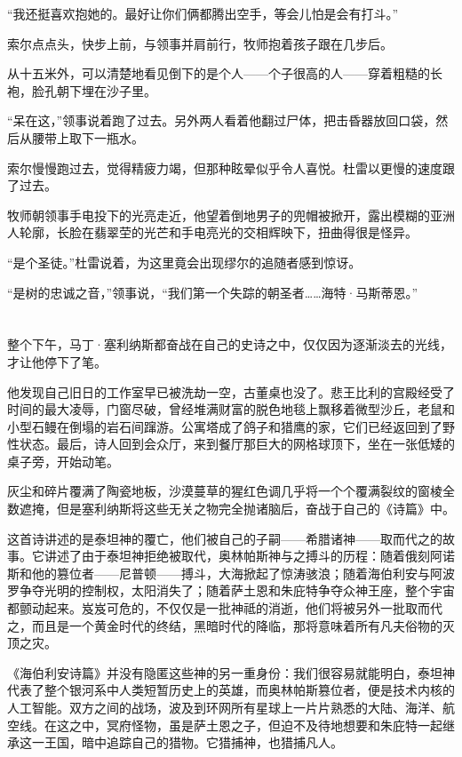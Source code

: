 \documentclass[AutoFakeBold=true]{book}
\begin{document}
``我还挺喜欢抱她的。最好让你们俩都腾出空手，等会儿怕是会有打斗。''

索尔点点头，快步上前，与领事并肩前行，牧师抱着孩子跟在几步后。

从十五米外，可以清楚地看见倒下的是个人——个子很高的人——穿着粗糙的长袍，脸孔朝下埋在沙子里。

``呆在这，''领事说着跑了过去。另外两人看着他翻过尸体，把击昏器放回口袋，然后从腰带上取下一瓶水。

索尔慢慢跑过去，觉得精疲力竭，但那种眩晕似乎令人喜悦。杜雷以更慢的速度跟了过去。

牧师朝领事手电投下的光亮走近，他望着倒地男子的兜帽被掀开，露出模糊的亚洲人轮廓，长脸在翡翠茔的光芒和手电亮光的交相辉映下，扭曲得很是怪异。

``是个圣徒。''杜雷说着，为这里竟会出现缪尔的追随者感到惊讶。

``是树的忠诚之音，''领事说，``我们第一个失踪的朝圣者……海特·马斯蒂恩。''

\chapter{}

整个下午，马丁·塞利纳斯都奋战在自己的史诗之中，仅仅因为逐渐淡去的光线，才让他停下了笔。

他发现自己旧日的工作室早已被洗劫一空，古董桌也没了。悲王比利的宫殿经受了时间的最大凌辱，门窗尽破，曾经堆满财富的脱色地毯上飘移着微型沙丘，老鼠和小型石鳗在倒塌的岩石间蹿游。公寓塔成了鸽子和猎鹰的家，它们已经返回到了野性状态。最后，诗人回到会众厅，来到餐厅那巨大的网格球顶下，坐在一张低矮的桌子旁，开始动笔。

灰尘和碎片覆满了陶瓷地板，沙漠蔓草的猩红色调几乎将一个个覆满裂纹的窗棱全数遮掩，但是塞利纳斯将这些无关之物完全抛诸脑后，奋战于自己的《诗篇》中。

这首诗讲述的是泰坦神的覆亡，他们被自己的子嗣——希腊诸神——取而代之的故事。它讲述了由于泰坦神拒绝被取代，奥林帕斯神与之搏斗的历程：随着俄刻阿诺斯和他的篡位者——尼普顿——搏斗，大海掀起了惊涛骇浪；随着海伯利安与阿波罗争夺光明的控制权，太阳消失了；随着萨土恩和朱庇特争夺众神王座，整个宇宙都颤动起来。岌岌可危的，不仅仅是一批神祗的消逝，他们将被另外一批取而代之，而且是一个黄金时代的终结，黑暗时代的降临，那将意味着所有凡夫俗物的灭顶之灾。

《海伯利安诗篇》并没有隐匿这些神的另一重身份：我们很容易就能明白，泰坦神代表了整个银河系中人类短暂历史上的英雄，而奥林帕斯篡位者，便是技术内核的人工智能。双方之间的战场，波及到环网所有星球上一片片熟悉的大陆、海洋、航空线。在这之中，冥府怪物，虽是萨土恩之子，但迫不及待地想要和朱庇特一起继承这一王国，暗中追踪自己的猎物。它猎捕神，也猎捕凡人。
\end{document}
